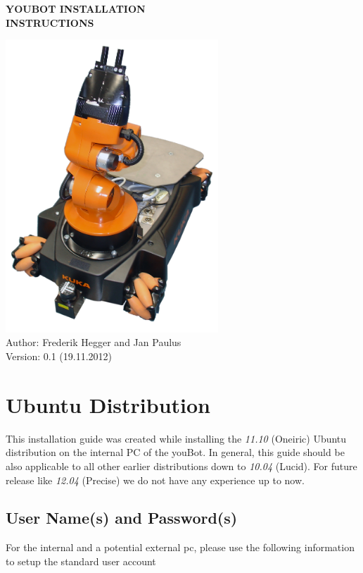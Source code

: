 \documentclass[a4paper,12pt]{article}
\begin{document}
\begin{center}
	\Huge
	\textbf{YOUBOT INSTALLATION}\\
	\textbf{INSTRUCTIONS}\\
	\vspace{3 cm} 

	\includegraphics[width=0.60\textwidth]{gfx/youbot.png}
	\textbf{}\\
	\vspace{3 cm} 
	\normalsize
	Author: Frederik Hegger and Jan Paulus\\
    Version: 0.1 (19.11.2012)\\
    
	
\end{center}
\newpage

\tableofcontents 
\newpage

\section{Ubuntu Distribution}
This installation guide was created while installing the \textit{11.10} (Oneiric) Ubuntu distribution on the internal PC of the youBot. In general, this guide should be also applicable to all other earlier distributions down to \textit{10.04} (Lucid). For future release like \textit{12.04} (Precise) we do not have any experience up to now.



\subsection{User Name(s) and Password(s)}
For the internal and a potential external pc, please use the following information to setup the standard user account
	
\end{document}
